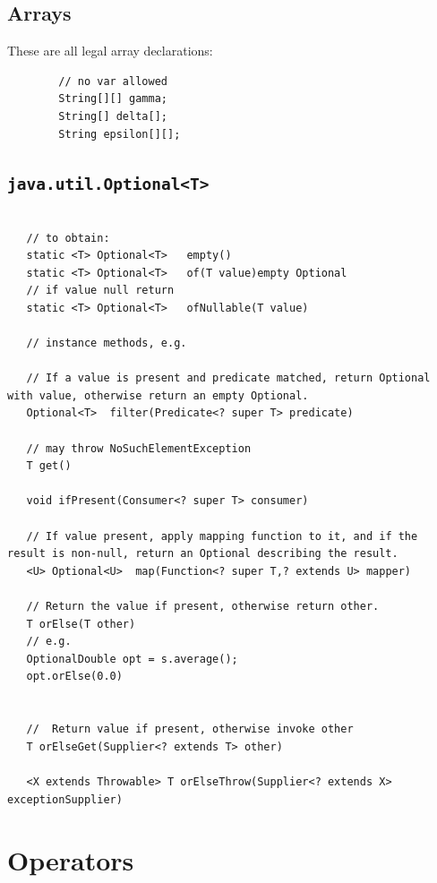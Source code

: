 \documentclass{scrartcl}
\begin{document}
\subsection{Arrays}

    These are all legal array declarations:

    \begin{lstlisting}
        // no var allowed
        String[][] gamma;
        String[] delta[];
        String epsilon[][];
    \end{lstlisting}

\subsection{\lstinline|java.util.Optional<T>|}

\begin{lstlisting}

   // to obtain:
   static <T> Optional<T> 	empty()
   static <T> Optional<T> 	of(T value)empty Optional
   // if value null return
   static <T> Optional<T> 	ofNullable(T value)

   // instance methods, e.g.

   // If a value is present and predicate matched, return Optional with value, otherwise return an empty Optional.
   Optional<T> 	filter(Predicate<? super T> predicate)

   // may throw NoSuchElementException
   T get()

   void ifPresent(Consumer<? super T> consumer)

   // If value present, apply mapping function to it, and if the result is non-null, return an Optional describing the result.
   <U> Optional<U> 	map(Function<? super T,? extends U> mapper)

   // Return the value if present, otherwise return other.
   T orElse(T other)
   // e.g.
   OptionalDouble opt = s.average();
   opt.orElse(0.0)


   //  Return value if present, otherwise invoke other
   T orElseGet(Supplier<? extends T> other)

   <X extends Throwable> T orElseThrow(Supplier<? extends X> exceptionSupplier)

\end{lstlisting}



\section{Operators}
\end{document}
